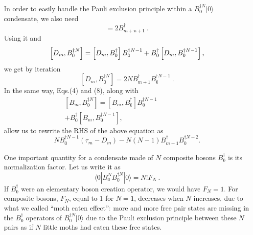 \documentclass[twocolumn,showpacs]{revtex4}
\begin{document}
In order to easily handle the Pauli exclusion principle within a $B_0^{\dag N}|0\rangle$ condensate, we also need
\begin{equation}
[D_m,B_n^\dag]=2B_{m+n+1}^\dag\ .
\end{equation}
Using it and
\begin{equation}
\left[D_m,B_0^{\dag N}\right]=\left[D_m,B_0^\dag\right]B_0^{\dag N-1}\hspace{1cm}\nonumber\\
+B_0^\dag\left[D_m,B_0^{\dag N-1}\right],
\end{equation}
we get by iteration
\begin{equation}
\left[D_m,B_0^{\dag N}\right]=2NB_{m+1}^\dag B_0^{\dag N-1}\ .
\end{equation}
In the same way, Eqs.(4) and (8), along with
\begin{eqnarray}
\left[B_m,B_0^{\dag N}\right]=\left[B_m,B_0^\dag\right]B_0^{\dag N-1}\hspace{2cm}\nonumber\\
+B_0^\dag\left[B_m,B_0^{\dag N-1}\right],\label{Bcomm}
\end{eqnarray}
allow us to rewrite the RHS of the above equation as
\begin{equation}\label{BcommRHS}
NB_0^{\dag N-1}(\tau_m-D_m)-N(N-1)B_{m+1}^\dag B_0^{\dag N-2}.
\end{equation}

One important quantity for a condensate made of $N$ composite bosons $B_0^\dag$ is its normalization factor. Let us write it as
\begin{equation}
\langle 0|B_0^NB_0^{\dag N}|0\rangle=N!F_N\ .
\end{equation}
If $B_0^\dag$ were an elementary boson creation operator, we would have $F_N=1$. For composite bosons, $F_N$, equal to 1 for $N=1$, decreases when $N$ increases, due to what we called ``moth eaten effect'': more and more free pair states are missing in the $B_0^\dag$ operators of $B_0^{\dag N}|0\rangle$ due to the Pauli exclusion principle between these $N$ pairs as if $N$ little moths had eaten these free states. 
\end{document}
